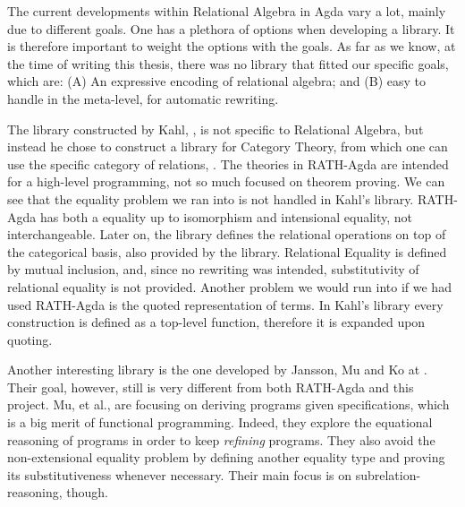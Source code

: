 The current developments within Relational Algebra in Agda vary a lot, mainly due to
different goals. One has a plethora of options when developing a library. It is therefore
important to weight the options with the goals. As far as we know, at the time
of writing this thesis, there was no library that fitted our specific goals, which
are: (A) An expressive encoding of relational algebra; and (B) easy to handle in the meta-level,
for automatic rewriting.

The library constructed by Kahl, \cite{RATHAgda}, is not specific to Relational Algebra, but
instead he chose to construct a library for Category Theory, from which one can use
the specific category of relations, . The theories in RATH-Agda are intended
for a high-level programming, not so much focused on theorem proving. We can see that
the equality problem we ran into is not handled in Kahl's library. RATH-Agda has both a equality up to
isomorphism and intensional equality, not interchangeable. Later on, the library
defines the relational operations on top of the categorical basis, also provided by the library.
Relational Equality is defined by mutual inclusion, and, since no rewriting was intended,
substitutivity of relational equality is not provided. Another problem we would run into
if we had used RATH-Agda is the quoted representation of terms. In Kahl's library every
construction is defined as a top-level function, therefore it is expanded upon quoting. 

Another interesting library is the one developed by Jansson, Mu and Ko at \cite{Jansson09}. 
Their goal, however, still is very different from both RATH-Agda and this project.
Mu, et al., are focusing on deriving programs given specifications, which is a big merit of
functional programming. Indeed, they explore the equational reasoning of programs in order to keep
\emph{refining} programs. They also avoid the non-extensional equality problem by defining
another equality type and proving its substitutiveness whenever necessary. Their main focus
is on subrelation-reasoning, though.
